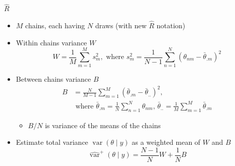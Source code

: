 \documentclass[finnish,english,t]{beamer}
\DeclareMathOperator{\var}{var}
\begin{document}
\begin{frame}{$\widehat{R}$}

  \begin{itemize}
  \item $M$ chains, each having $N$ draws (with new $\widehat{R}$ notation)
  \item<2-> Within chains variance $W$
    \begin{equation*}
      W=\frac{1}{M}\sum_{m=1}^M s^2_m ,\text{ where } 
      s^2_m=\frac{1}{N-1}\sum_{n=1}^N (\theta_{nm}-\bar{\theta}_{.m})^2
    \end{equation*}
  \item<3-> Between chains variance $B$
    \begin{align*}
      B&=\frac{N}{M-1}\sum_{m=1}^M
      (\bar{\theta}_{.m}-\bar{\theta}_{..})^2,\\
      &\text{ where } \bar{\theta}_{.m}=\frac{1}{N}\sum_{n=1}^N \theta_{nm}, \,
      \bar{\theta}_{..}=\frac{1}{M}\sum_{m=1}^M\bar{\theta}_{.m}
    \end{align*}
    \begin{itemize}
      \item<4-> $B/N$ is variance of the means of the chains
    \end{itemize}
    \vspace{2mm}
  \item<5-> Estimate total variance
    $\var(\theta \mid y)$ as a weighted mean of $W$ and $B$
    \begin{equation*}
      \widehat{\var}^{+}(\theta \mid y) = \frac{N-1}{N}W+\frac{1}{N}B
    \end{equation*}
  \end{itemize}  

\end{frame}


\end{document}
